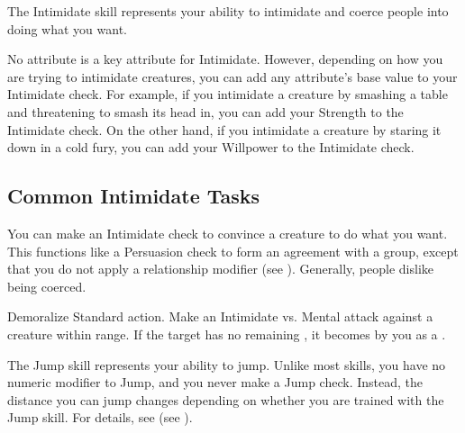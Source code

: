 \newpage
{}
  The Intimidate skill represents your ability to intimidate and coerce people into doing what you want.

  No attribute is a key attribute for Intimidate.
  However, depending on how you are trying to intimidate creatures, you can add any attribute's base value to your Intimidate check.
  For example, if you intimidate a creature by smashing a table and threatening to smash its head in, you can add your Strength to the Intimidate check.
  On the other hand, if you intimidate a creature by staring it down in a cold fury, you can add your Willpower to the Intimidate check.

  \subsection{Common Intimidate Tasks}
     You can make an Intimidate check to convince a creature to do what you want. This functions like a Persuasion check to form an agreement with a group, except that you do not apply a relationship modifier (see ).
    Generally, people dislike being coerced.

    \begin{activeability}{Demoralize}
      \abilityusagetime Standard action.
      \rankline
      Make an Intimidate vs. Mental attack against a creature within \rngmed range.
      \hit If the target has no remaining , it becomes \frightened by you as a .
    \end{activeability}

\newpage
{}
  The Jump skill represents your ability to jump.
  Unlike most skills, you have no numeric modifier to Jump, and you never make a Jump check.
  Instead, the distance you can jump changes depending on whether you are trained with the Jump skill.
  For details, see (see ).

